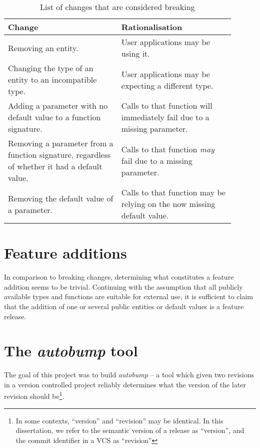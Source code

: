 \documentclass{l4proj}
\begin{document}
\begin{table}[H]
\centering
\begin{tabular}{|p{0.45\linewidth}|p{0.45\linewidth}|}
\hline
\textbf{Change}                                                                               & \textbf{Rationalisation}                                                 \\
\hline
Removing an entity.                                                                           & User applications may be using it.                                       \\
\hline
Changing the type of an entity to an incompatible type.                                       & User applications may be expecting a different type.                     \\
\hline
Adding a parameter with no default value to a function signature.                             & Calls to that function will immediately fail due to a missing parameter. \\
\hline
Removing a parameter from a function signature, regardless of whether it had a default value. & Calls to that function \textit{may} fail due to a missing parameter.     \\
\hline
Removing the default value of a parameter.                                                    & Calls to that function may be relying on the now missing default value.  \\
\hline
\end{tabular}
\caption{List of changes that are considered breaking}
\end{table}

\section{Feature additions}

In comparison to breaking changes, determining what constitutes a
feature addition seems to be trivial. Continuing with the assumption
that all publicly available types and functions are suitable for
external use, it is sufficient to claim that the addition of one or
several public entities or default values is a feature release.

\section{The \textit{autobump} tool}

The goal of this project was to build \textit{autobump} -- a tool which
given two revisions in a version controlled project reliably
determines what the version of the later revision should
be\footnote{In some contexts, ``version'' and ``revision'' may be
identical. In this dissertation, we refer to the semantic version of a
release as ``version'', and the commit identifier in a VCS as ``revision''}.
\end{document}
